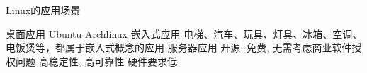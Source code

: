 

\begin{frame}{Linux的应用场景}
    \begin{myoutline}
        \1 桌面应用
            \2 Ubuntu
            \2 Archlinux
        \1 嵌入式应用
            \2 电梯、汽车、玩具、灯具、冰箱、空调、电饭煲等，都属于嵌入式概念的应用
        \1 服务器应用
            \2 开源, 免费, 无需考虑商业软件授权问题
            \2 高稳定性, 高可靠性
            \2 硬件要求低
    \end{myoutline}
\end{frame}


